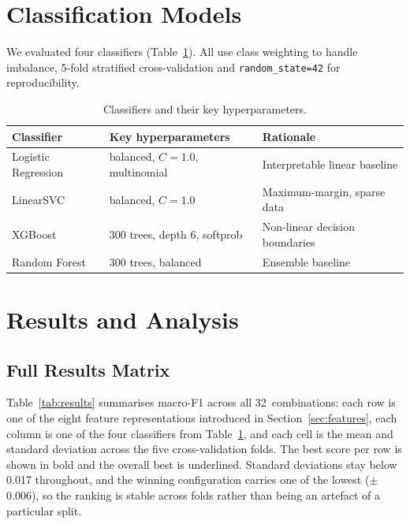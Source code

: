 \documentclass[12pt,a4paper]{article}
\begin{document}
\section{Classification Models}
\label{sec:models}

We evaluated four classifiers (Table~\ref{tab:classifiers}). All use class weighting to handle imbalance, 5-fold stratified cross-validation and \texttt{random\_state=42} for reproducibility.

\begin{table}[!htbp]
\centering
\small
\begin{tabularx}{\textwidth}{lXX}
\toprule
\textbf{Classifier} & \textbf{Key hyperparameters} & \textbf{Rationale} \\
\midrule
Logistic Regression & balanced, $C=1.0$, multinomial   & Interpretable linear baseline \\
LinearSVC           & balanced, $C=1.0$                 & Maximum-margin, sparse data \\
XGBoost             & 300 trees, depth 6, softprob       & Non-linear decision boundaries \\
Random Forest       & 300 trees, balanced                & Ensemble baseline \\
\bottomrule
\end{tabularx}
\caption{Classifiers and their key hyperparameters.}
\label{tab:classifiers}
\end{table}

\FloatBarrier

\section{Results and Analysis}
\label{sec:results}

\subsection{Full Results Matrix}

Table~\ref{tab:results} summarises macro-F1 across all 32~combinations: each row is one of the eight feature representations introduced in Section~\ref{sec:features}, each column is one of the four classifiers from Table~\ref{tab:classifiers}, and each cell is the mean and standard deviation across the five cross-validation folds. The best score per row is shown in bold and the overall best is underlined. Standard deviations stay below 0.017 throughout, and the winning configuration carries one of the lowest ($\pm$0.006), so the ranking is stable across folds rather than being an artefact of a particular split.
\end{document}
